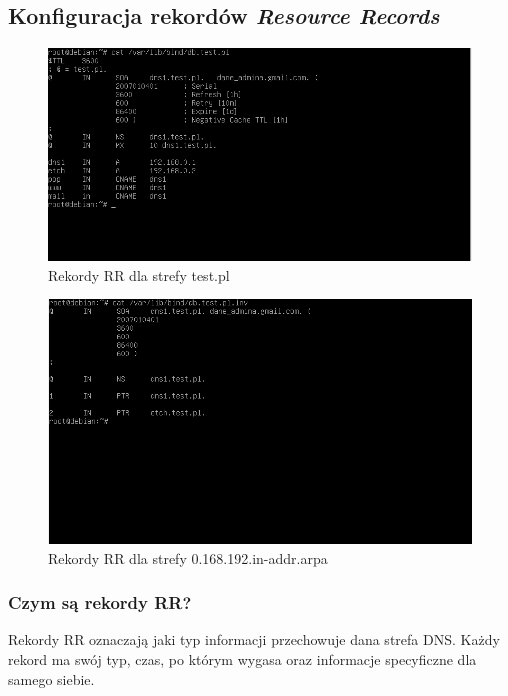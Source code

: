 \documentclass[12pt, a4paper]{article}
\begin{document}
    \subsection{Konfiguracja rekordów \textit{Resource Records}}
        \begin{figure}[!h]
            \centering
            \includegraphics[width = \textwidth]{db_test_pl.PNG}
            \caption{Rekordy RR dla strefy test.pl}
            \label{fig:testpl}
        \end{figure}
        \newpage
        \begin{figure}[!h]
            \centering
            \includegraphics[width = \textwidth]{db_test_pl_inv.PNG}
            \caption{Rekordy RR dla strefy 0.168.192.in-addr.arpa}
            \label{fig:arpa}
        \end{figure}

        \subsubsection{Czym są rekordy RR?}
            Rekordy RR oznaczają jaki typ informacji przechowuje dana strefa DNS. Każdy rekord ma swój typ, czas, po którym wygasa oraz informacje specyficzne dla samego siebie.
            
\end{document}
